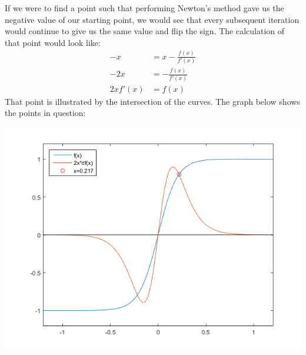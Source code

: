\documentclass[11pt,a4paper]{article}
\begin{document}
\begin{itemize}
\begin{enumerate} [label={\alph*)}]
					If we were to find a point such that performing Newton's method gave us the negative value of our starting point, we would see that every subsequent iteration would continue to give us the same value and flip the sign. The calculation of that point would look like:
					\begin{align*}
						-x &= x - \frac{f(x)}{f'(x)} \\
						-2x &= -\frac{f(x)}{f'(x)} \\
						2xf'(x) &= f(x)
					\end{align*}
					That point is illustrated by the intersection of the curves.
					The graph below shows the points in question:
					\begin{center}
						\includegraphics[width=1\linewidth]{ch2q25d}
					\end{center}
				\end{enumerate}
		\end{itemize}
		
\end{document}
